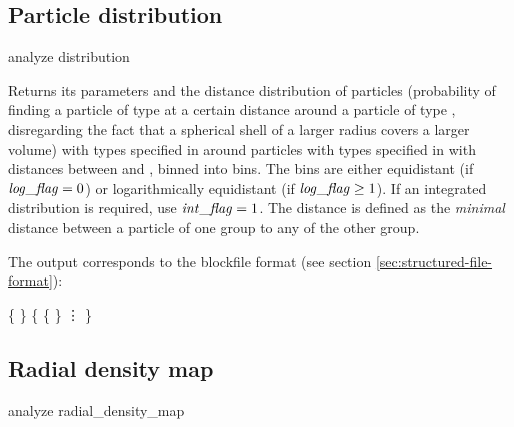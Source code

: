 \subsection{Particle distribution}
\label{analyze:distribution}

\begin{pysyntax}
\end{pysyntax}

\begin{essyntax}
  analyze distribution  
\end{essyntax}
Returns its parameters and the distance distribution of particles 
(probability of finding a particle of type  at a certain distance 
around a particle of type , disregarding the fact that a spherical 
shell of a larger radius covers a larger volume) with
types specified in  around particles with
types specified in  with distances between
 and , binned into  bins. The
bins are either equidistant (if $\mathrm{\mathit{log\_flag}} = 0$) or
logarithmically equidistant (if $\mathrm{\mathit{log\_flag}} \geq 1$). If an
integrated distribution is required, use $\mathrm{\mathit{int\_flag}}=1$. The
distance is defined as the \emph{minimal} distance between a particle
of one group to any of the other group.


The output corresponds to the blockfile format (see section
\vref{sec:structured-file-format}):
\begin{code}
\{  \} 
\{ 
  \{   \} 
  \vdots 
\}
\end{code}

\subsection{Radial density map}
\label{analyze:radialdensitymap}

\begin{essyntax}
  analyze radial_density_map    
\end{essyntax}

